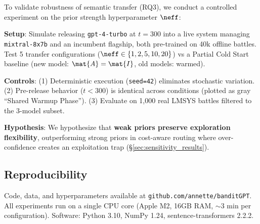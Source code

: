 To validate robustness of semantic transfer (RQ3), we conduct a controlled experiment on the prior strength hyperparameter $\neff$:

\textbf{Setup}: Simulate releasing \texttt{gpt-4-turbo} at $t=300$ into a live system managing \texttt{mixtral-8x7b} and an incumbent flagship, both pre-trained on 40k offline battles. Test 5 transfer configurations ($\neff \in \{1, 2, 5, 10, 20\}$) vs a Partial Cold Start baseline (new model: $\mat{A}=\mat{I}$, old models: warmed).

\textbf{Controls}: (1) Deterministic execution (\texttt{seed=42}) eliminates stochastic variation. (2) Pre-release behavior ($t<300$) is identical across conditions (plotted as gray ``Shared Warmup Phase''). (3) Evaluate on 1,000 real LMSYS battles filtered to the 3-model subset.

\textbf{Hypothesis}: We hypothesize that \textbf{weak priors preserve exploration flexibility}, outperforming strong priors in cost-aware routing where over-confidence creates an exploitation trap (§\ref{sec:sensitivity_results}).

\subsection{Reproducibility}

Code, data, and hyperparameters available at \texttt{github.com/annette/banditGPT}. All experiments run on a single CPU core (Apple M2, 16GB RAM, $\sim$3 min per configuration). Software: Python 3.10, NumPy 1.24, sentence-transformers 2.2.2.

